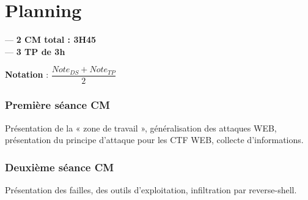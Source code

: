 \chapter{Planning}

\vspace{-1cm}
\noindent --- \textbf{2 CM total : 3H45}\\
\noindent --- \textbf{3 TP de 3h}

\textbf{Notation} : $\dfrac{Note_{DS}+Note_{TP}}{2}$

\vspace{1cm}

\subsection*{Première séance CM}

\noindent Présentation de la « zone de travail », généralisation des attaques WEB, présentation du principe d'attaque pour les CTF WEB, collecte d'informations.

\subsection*{Deuxième séance CM}

\noindent Présentation des failles, des outils d'exploitation, infiltration par reverse-shell.
